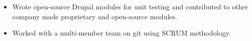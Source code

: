 \documentclass[]{friggeri-cv} %
\begin{document}
\begin{entrylist}
{\begin{itemize}
\item Wrote open-source Drupal modules for unit testing and contributed to other company made proprietary and open-source modules.
\item Worked with a multi-member team on git using SCRUM methodology.
\end{itemize}}
 \end{entrylist}
 \newpage
\end{document}

